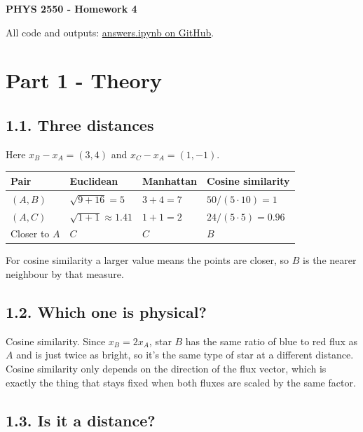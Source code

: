 \documentclass[11pt,a4paper]{article}
\begin{document}
{\fontsize{22}{26}\selectfont\bfseries PHYS 2550 - Homework 4\par}
\vspace{7pt}
All code and outputs: \href{https://github.com/aradhyajain430/phys-2550/blob/master/HW4/answers.ipynb}{answers.ipynb on GitHub}.

\section*{Part 1 - Theory}

\subsection*{1.1. Three distances}

Here $x_B-x_A=(3,4)$ and $x_C-x_A=(1,-1)$.

{\small\setlength{\tabcolsep}{4pt}
\begin{tabularx}{\linewidth}{|L|L|L|L|}
\hline
{}
\textbf{Pair} & \textbf{Euclidean} & \textbf{Manhattan} & \textbf{Cosine similarity} \\ \hline
$(A,B)$ & $\sqrt{9+16}=5$ & $3+4=7$ & $50/(5\cdot10)=1$ \\ \hline
$(A,C)$ & $\sqrt{1+1}\approx1.41$ & $1+1=2$ & $24/(5\cdot5)=0.96$ \\ \hline
Closer to $A$ & $C$ & $C$ & $B$ \\ \hline
\end{tabularx}\par}

For cosine similarity a larger value means the points are closer, so $B$ is the nearer neighbour by that measure.

\subsection*{1.2. Which one is physical?}

Cosine similarity. Since $x_B=2x_A$, star $B$ has the same ratio of blue to red flux as $A$ and is just twice as bright, so it's the same type of star at a different distance. Cosine similarity only depends on the direction of the flux vector, which is exactly the thing that stays fixed when both fluxes are scaled by the same factor.

\subsection*{1.3. Is it a distance?}
\end{document}
